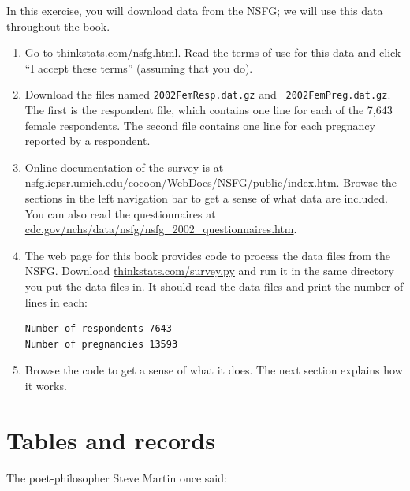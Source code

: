\documentclass[12pt]{book}
\begin{document}
\begin{exercise}
In this exercise, you will download data from the NSFG; we will use
this data throughout the book.


\begin{enumerate}

\item Go to \url{thinkstats.com/nsfg.html}.  Read the terms of
use for this data and click ``I accept these terms'' (assuming that you do).

\item Download the files named {\tt 2002FemResp.dat.gz} and {\tt
  2002FemPreg.dat.gz}.  The first is the respondent file, which contains
  one line for each of the 7,643 female respondents.
  The second file contains one line for each pregnancy reported by a
  respondent.

\item Online documentation of the survey is at
  \url{nsfg.icpsr.umich.edu/cocoon/WebDocs/NSFG/public/index.htm}.
  Browse the sections in the left navigation bar to get a sense of
  what data are included.  You can also read the questionnaires
  at \url{cdc.gov/nchs/data/nsfg/nsfg_2002_questionnaires.htm}.

\item The web page for this book provides code to process the data
  files from the NSFG.  Download \url{thinkstats.com/survey.py}
  and run it in the same directory you put the data files in.  It
  should read the data files and print the number of lines in each:


\begin{verbatim}
Number of respondents 7643
Number of pregnancies 13593
\end{verbatim}

\item Browse the code to get a sense of what it does.  The next
section explains how it works.

\end{enumerate}

\end{exercise}

\section{Tables and records}

The poet-philosopher Steve Martin once said:
\end{document}
